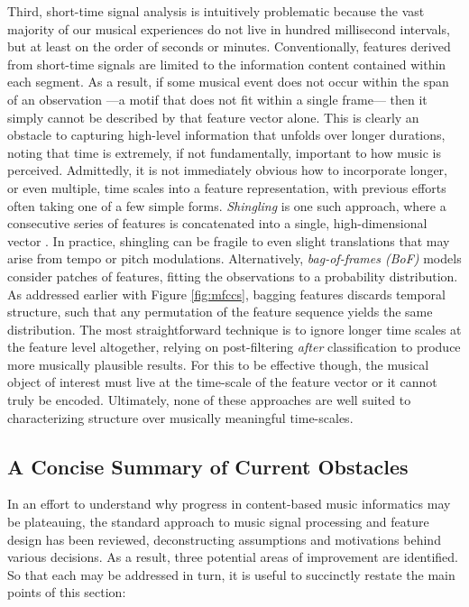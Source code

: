 Third, short-time signal analysis is intuitively problematic because the vast majority of our musical experiences do not live in hundred millisecond intervals, but at least on the order of seconds or minutes.
Conventionally, features derived from short-time signals are limited to the information content contained within each segment.
As a result, if some musical event does not occur within the span of an observation ---a motif that does not fit within a single frame--- then it simply cannot be described by that feature vector alone.
This is clearly an obstacle to capturing high-level information that unfolds over longer durations, noting that time is extremely, if not fundamentally, important to how music is perceived.
Admittedly, it is not immediately obvious how to incorporate longer, or even multiple, time scales into a feature representation, with previous efforts often taking one of a few simple forms.
\emph{Shingling} is one such approach, where a consecutive series of features is concatenated into a single, high-dimensional vector \cite{Casey2008}.
In practice, shingling can be fragile to even slight translations that may arise from tempo or pitch modulations.
Alternatively, \emph{bag-of-frames (BoF)} models consider patches of features, fitting the observations to a probability distribution.
As addressed earlier with Figure \ref{fig:mfccs}, bagging features discards temporal structure, such that any permutation of the feature sequence yields the same distribution.
The most straightforward technique is to ignore longer time scales at the feature level altogether, relying on post-filtering \emph{after} classification to produce more musically plausible results.
For this to be effective though, the musical object of interest must live at the time-scale of the feature vector or it cannot truly be encoded.
Ultimately, none of these approaches are well suited to characterizing structure over musically meaningful time-scales.



\subsection{A Concise Summary of Current Obstacles}
\label{subsec:obstacles}
In an effort to understand why progress in content-based music informatics may be plateauing, the standard approach to music signal processing and feature design has been reviewed, deconstructing assumptions and motivations behind various decisions.
As a result, three potential areas of improvement are identified.
So that each may be addressed in turn, it is useful to succinctly restate the main points of this section:

